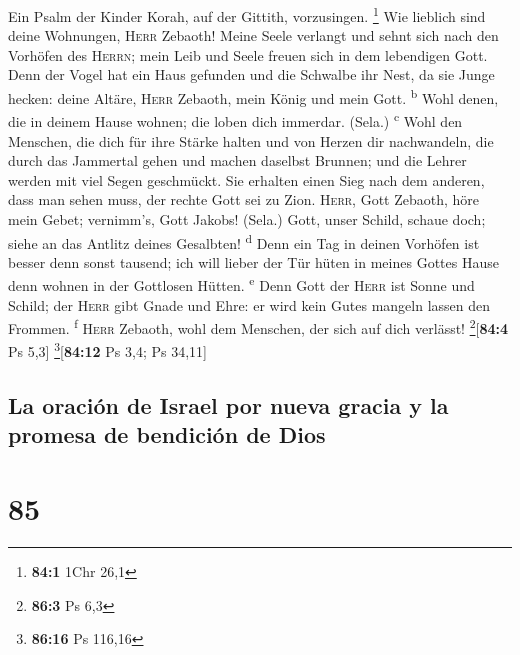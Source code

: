  Ein Psalm der Kinder Korah, auf der Gittith, vorzusingen.
\footnote{\textbf{84:1} 1Chr 26,1}  Wie lieblich sind
deine Wohnungen, \textsc{Herr} Zebaoth!  Meine Seele
verlangt und sehnt sich nach den Vorhöfen des \textsc{Herrn}; mein Leib
und Seele freuen sich in dem lebendigen Gott.  Denn der
Vogel hat ein Haus gefunden und die Schwalbe ihr Nest, da sie Junge
hecken: deine Altäre, \textsc{Herr} Zebaoth, mein König und mein Gott.
\textsuperscript{b}  Wohl denen, die in deinem Hause
wohnen; die loben dich immerdar. (Sela.) \textsuperscript{c}
 Wohl den Menschen, die dich für ihre Stärke halten und
von Herzen dir nachwandeln,  die durch das Jammertal gehen
und machen daselbst Brunnen; und die Lehrer werden mit viel Segen
geschmückt.  Sie erhalten einen Sieg nach dem anderen,
dass man sehen muss, der rechte Gott sei zu Zion. 
\textsc{Herr}, Gott Zebaoth, höre mein Gebet; vernimm's, Gott Jakobs!
(Sela.)  Gott, unser Schild, schaue doch; siehe an das
Antlitz deines Gesalbten! \textsuperscript{d}  Denn ein
Tag in deinen Vorhöfen ist besser denn sonst tausend; ich will lieber
der Tür hüten in meines Gottes Hause denn wohnen in der Gottlosen
Hütten. \textsuperscript{e}  Denn Gott der \textsc{Herr}
ist Sonne und Schild; der \textsc{Herr} gibt Gnade und Ehre: er wird
kein Gutes mangeln lassen den Frommen. \textsuperscript{f}
 \textsc{Herr} Zebaoth, wohl dem Menschen, der sich auf
dich verlässt! \footnote{\textbf{86:3} Ps 6,3}{[}\textbf{84:4} Ps 5,3{]}
\footnote{\textbf{86:16} Ps 116,16}{[}\textbf{84:12} Ps 3,4; Ps 34,11{]}

\hypertarget{la-oraciuxf3n-de-israel-por-nueva-gracia-y-la-promesa-de-bendiciuxf3n-de-dios}{%
\subsection{La oración de Israel por nueva gracia y la promesa de
bendición de
Dios}\label{la-oraciuxf3n-de-israel-por-nueva-gracia-y-la-promesa-de-bendiciuxf3n-de-dios}}

\hypertarget{section-84}{%
\section{85}\label{section-84}}

